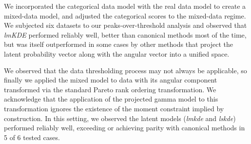 We incorporated the categorical data model with the real data model to create a 
    mixed-data model, and adjusted the categorical scores to the mixed-data 
    regime.  We subjected six datasets to our peaks-over-threshold analysis and 
    observed that \emph{lmKDE} performed reliably well, better than canonical 
    methods most of the time, but was itself outperformed in some cases by other 
    methods that project the latent probability vector along with the angular 
    vector into a unified space.

We observed that the data thresholding process may not always be applicable, so 
    finally we applied the mixed model to data with its angular component 
    transformed via the standard Pareto rank ordering transformation.  We
    acknowledge that the application of the projected gamma model to this
    transformation ignores the existence of the moment constraint implied by
    construction. In this setting, we observed the latent models (\emph{lmkde} 
    and \emph{lskde}) performed reliably well, exceeding or achieving parity
    with canonical methods in 5 of 6 tested cases.



    
    
